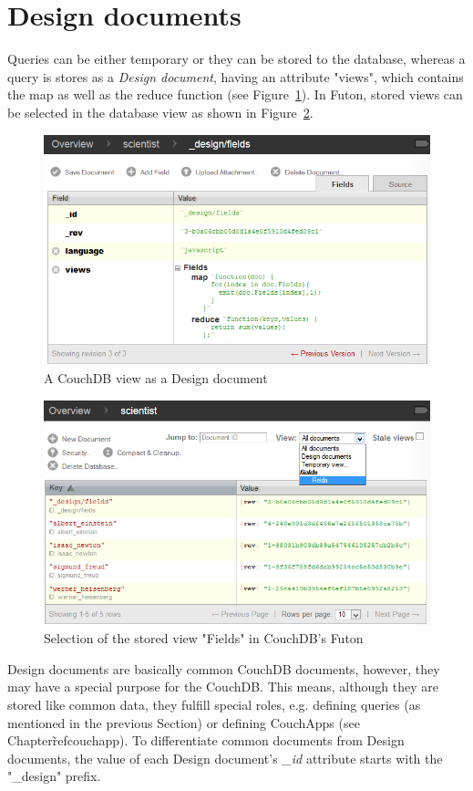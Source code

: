 \section{Design documents}
\label{designdocument}
Queries can be either temporary or they can be stored to the database, whereas a query is stores as a \emph{Design document}, having an attribute "views", which contains the map as well as the reduce function (see Figure~\ref{img:couchdbviewdocument}). In Futon, stored views can be selected in the database view as shown in Figure~\ref{img:couchdbviewselection}.\\
\begin{figure}[h!]
\centering
\includegraphics[width=0.65\columnwidth]{images/couchdbviewdocument.png}
\caption{A CouchDB view as a Design document}
\label{img:couchdbviewdocument}
\end{figure}

\begin{figure}[h!]
\centering
\includegraphics[width=0.65\columnwidth]{images/couchdbviewselection.png}
\caption{Selection of the stored view "Fields" in CouchDB's Futon}
\label{img:couchdbviewselection}
\end{figure}

Design documents are basically common CouchDB documents, however, they may have a special purpose for the CouchDB. This means, although they are stored like common data, they fulfill special roles, e.g. defining queries (as mentioned in the previous Section) or defining CouchApps (see Chapter\~ref{couchapp}). To differentiate common documents from Design documents, the value of each Design document's \emph{\_id} attribute starts with the "\_design\/" prefix.
